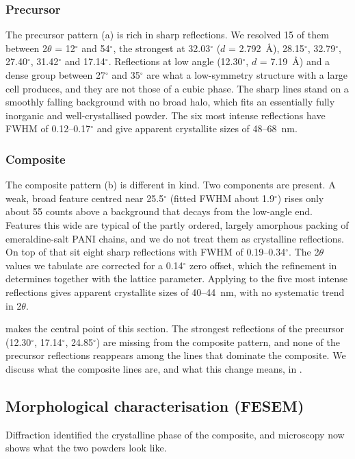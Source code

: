 \documentclass[preprint,11pt]{elsarticle}
\begin{document}
\subsubsection{Precursor}
The precursor pattern (a) is rich in sharp reflections. We resolved 15 of them between 2$\theta$ = 12$^{\circ}$ and 54$^{\circ}$, the strongest at 32.03$^{\circ}$ ($d$ = 2.792~\AA), 28.15$^{\circ}$, 32.79$^{\circ}$, 27.40$^{\circ}$, 31.42$^{\circ}$ and 17.14$^{\circ}$. Reflections at low angle (12.30$^{\circ}$, $d$ = 7.19~\AA) and a dense group between 27$^{\circ}$ and 35$^{\circ}$ are what a low-symmetry structure with a large cell produces, and they are not those of a cubic phase. The sharp lines stand on a smoothly falling background with no broad halo, which fits an essentially fully inorganic and well-crystallised powder. The six most intense reflections have FWHM of 0.12--0.17$^{\circ}$ and give apparent crystallite sizes of 48--68~nm.



\subsubsection{Composite}
The composite pattern (b) is different in kind. Two components are present. A weak, broad feature centred near 25.5$^{\circ}$ (fitted FWHM about 1.9$^{\circ}$) rises only about 55 counts above a background that decays from the low-angle end. Features this wide are typical of the partly ordered, largely amorphous packing of emeraldine-salt PANI chains, and we do not treat them as crystalline reflections. On top of that sit eight sharp reflections with FWHM of 0.19--0.34$^{\circ}$. The 2$\theta$ values we tabulate are corrected for a 0.14$^{\circ}$ zero offset, which the refinement in  determines together with the lattice parameter. Applying  to the five most intense reflections gives apparent crystallite sizes of 40--44~nm, with no systematic trend in 2$\theta$.



 makes the central point of this section. The strongest reflections of the precursor (12.30$^{\circ}$, 17.14$^{\circ}$, 24.85$^{\circ}$) are missing from the composite pattern, and none of the precursor reflections reappears among the lines that dominate the composite. We discuss what the composite lines are, and what this change means, in .

\subsection{Morphological characterisation (FESEM)}
\label{sec:fesem}
Diffraction identified the crystalline phase of the composite, and microscopy now shows what the two powders look like.
\end{document}
